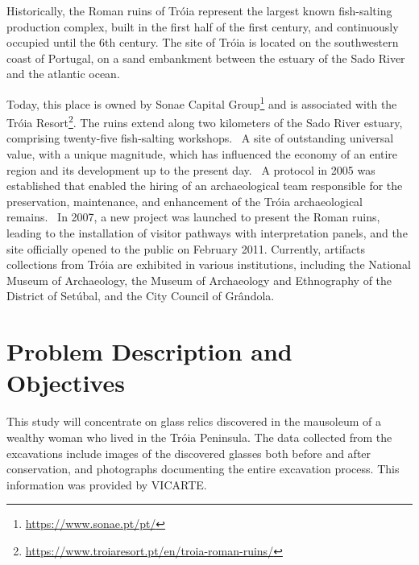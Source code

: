 Historically, the Roman ruins of Tróia represent the largest known fish-salting production complex, built in the first half of the first century, and continuously occupied until the 6th century. 
The site of Tróia is located on the southwestern coast of Portugal, on a sand embankment between the estuary of the Sado River and the atlantic ocean.~\cite{pinto2018reassessment} 

Today, this place is owned by Sonae Capital Group\footnote{\url{https://www.sonae.pt/pt/}} and is associated with the Tróia Resort\footnote{\url{https://www.troiaresort.pt/en/troia-roman-ruins/}}.
The ruins extend along two kilometers of the Sado River estuary, comprising twenty-five fish-salting workshops.~\cite{hocquet2015fish}
A site of outstanding  universal value, with a unique magnitude, which has influenced the economy of an entire region and its development up to the present day.~\cite{unesco_troia} 
A protocol in 2005 was established that enabled the hiring of an archaeological team responsible for the preservation, maintenance, and enhancement of the Tróia archaeological remains.~\cite{pinto2014ruinas} In 2007,
a new project was launched to present the Roman ruins, leading to the installation of visitor pathways with interpretation panels, and the site officially opened to the public on February 2011. 
Currently, artifacts collections from Tróia are exhibited in various institutions, including the National Museum of Archaeology, the Museum of Archaeology and Ethnography of the District of Setúbal, and the City Council of Grândola.




\section{Problem Description and Objectives}
\label{sec:problem_description_and_objectives} 
This study will concentrate on glass relics discovered in the mausoleum of a wealthy woman who lived in the Tróia Peninsula. The data collected from the excavations include 
images of the discovered glasses both before and after conservation, and photographs documenting the entire excavation process. 
This information was provided by \gls{VICARTE}.

